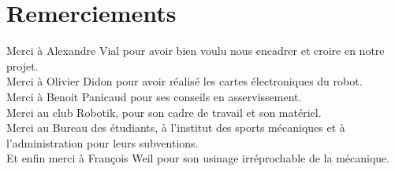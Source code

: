\chapter*{Remerciements}
    \noindent
    Merci à Alexandre Vial pour avoir bien voulu nous encadrer et croire en notre projet.\\
    Merci à Olivier Didon pour avoir réalisé les cartes électroniques du robot.\\
    Merci à Benoit Panicaud pour ses conseils en asservissement.\\
    Merci au club Robotik, pour son cadre de travail et son matériel.\\
    Merci au Bureau des étudiants, à l'institut des sports mécaniques et à l'administration pour leurs subventions.\\
    Et enfin merci à François Weil pour son usinage irréprochable de la mécanique.\\

